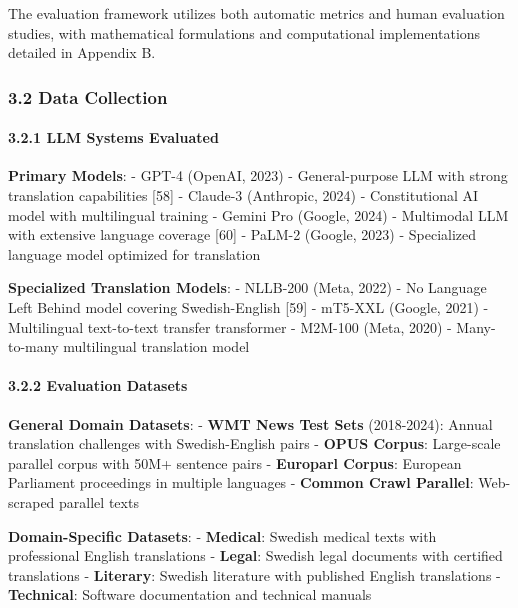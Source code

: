 \documentclass[12pt,a4paper]{article}
\begin{document}
{{The evaluation framework utilizes both automatic metrics and human
evaluation studies, with mathematical formulations and computational
implementations detailed in Appendix B.

\hypertarget{data-collection}{%
\subsubsection{3.2 Data Collection}\label{data-collection}}

\hypertarget{llm-systems-evaluated}{%
\paragraph{3.2.1 LLM Systems Evaluated}\label{llm-systems-evaluated}}

\textbf{Primary Models}: - GPT-4 (OpenAI, 2023) - General-purpose LLM
with strong translation capabilities {[}58{]} - Claude-3 (Anthropic,
2024) - Constitutional AI model with multilingual training - Gemini Pro
(Google, 2024) - Multimodal LLM with extensive language coverage
{[}60{]} - PaLM-2 (Google, 2023) - Specialized language model optimized
for translation

\textbf{Specialized Translation Models}: - NLLB-200 (Meta, 2022) - No
Language Left Behind model covering Swedish-English {[}59{]} - mT5-XXL
(Google, 2021) - Multilingual text-to-text transfer transformer -
M2M-100 (Meta, 2020) - Many-to-many multilingual translation model

\hypertarget{evaluation-datasets}{%
\paragraph{3.2.2 Evaluation Datasets}\label{evaluation-datasets}}

\textbf{General Domain Datasets}: - \textbf{WMT News Test Sets}
(2018-2024): Annual translation challenges with Swedish-English pairs -
\textbf{OPUS Corpus}: Large-scale parallel corpus with 50M+ sentence
pairs - \textbf{Europarl Corpus}: European Parliament proceedings in
multiple languages - \textbf{Common Crawl Parallel}: Web-scraped
parallel texts

\textbf{Domain-Specific Datasets}: - \textbf{Medical}: Swedish medical
texts with professional English translations - \textbf{Legal}: Swedish
legal documents with certified translations - \textbf{Literary}: Swedish
literature with published English translations - \textbf{Technical}:
Software documentation and technical manuals

}}
\end{document}
